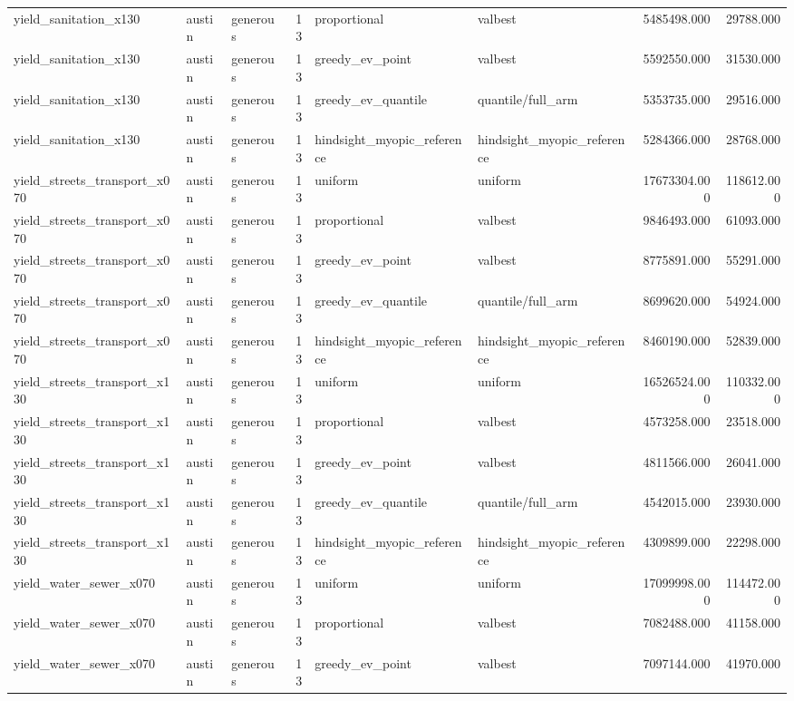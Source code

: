 \begin{tabular}{lllrllrr}
yield\_sanitation\_x130 & austin & generous & 13 & proportional & valbest & 5485498.000 & 29788.000 \\
yield\_sanitation\_x130 & austin & generous & 13 & greedy\_ev\_point & valbest & 5592550.000 & 31530.000 \\
yield\_sanitation\_x130 & austin & generous & 13 & greedy\_ev\_quantile & quantile/full\_arm & 5353735.000 & 29516.000 \\
yield\_sanitation\_x130 & austin & generous & 13 & hindsight\_myopic\_reference & hindsight\_myopic\_reference & 5284366.000 & 28768.000 \\
yield\_streets\_transport\_x070 & austin & generous & 13 & uniform & uniform & 17673304.000 & 118612.000 \\
yield\_streets\_transport\_x070 & austin & generous & 13 & proportional & valbest & 9846493.000 & 61093.000 \\
yield\_streets\_transport\_x070 & austin & generous & 13 & greedy\_ev\_point & valbest & 8775891.000 & 55291.000 \\
yield\_streets\_transport\_x070 & austin & generous & 13 & greedy\_ev\_quantile & quantile/full\_arm & 8699620.000 & 54924.000 \\
yield\_streets\_transport\_x070 & austin & generous & 13 & hindsight\_myopic\_reference & hindsight\_myopic\_reference & 8460190.000 & 52839.000 \\
yield\_streets\_transport\_x130 & austin & generous & 13 & uniform & uniform & 16526524.000 & 110332.000 \\
yield\_streets\_transport\_x130 & austin & generous & 13 & proportional & valbest & 4573258.000 & 23518.000 \\
yield\_streets\_transport\_x130 & austin & generous & 13 & greedy\_ev\_point & valbest & 4811566.000 & 26041.000 \\
yield\_streets\_transport\_x130 & austin & generous & 13 & greedy\_ev\_quantile & quantile/full\_arm & 4542015.000 & 23930.000 \\
yield\_streets\_transport\_x130 & austin & generous & 13 & hindsight\_myopic\_reference & hindsight\_myopic\_reference & 4309899.000 & 22298.000 \\
yield\_water\_sewer\_x070 & austin & generous & 13 & uniform & uniform & 17099998.000 & 114472.000 \\
yield\_water\_sewer\_x070 & austin & generous & 13 & proportional & valbest & 7082488.000 & 41158.000 \\
yield\_water\_sewer\_x070 & austin & generous & 13 & greedy\_ev\_point & valbest & 7097144.000 & 41970.000 \\

\end{tabular}
